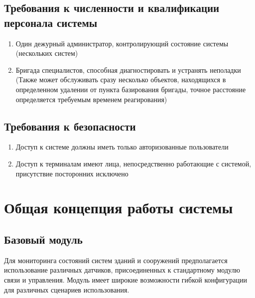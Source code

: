 \subsection{Требования к численности и квалификации персонала системы}
\begin{enumerate}
	\itemsep0em 
	\item Один дежурный администратор, контролирующий состояние системы (нескольких систем)
	\item Бригада специалистов, способная диагностировать и устранять неполадки (Также может обслуживать сразу несколько объектов, находящихся в определенном удалении от пункта базирования бригады, точное расстояние определяется требуемым временем реагирования)
	\end{enumerate}
\subsection{Требования к безопасности}
\begin{enumerate}
	\itemsep0em 
	\item Доступ к системе должны иметь только авторизованные пользователи
	\item Доступ к терминалам имеют лица, непосредственно работающие с системой, присутствие посторонних исключено
\end{enumerate}
\newpage\section{Общая концепция работы системы}
\subsection{Базовый модуль}
Для мониторинга состояний систем зданий и сооружений предполагается использование различных датчиков, присоединенных к стандартному модулю связи и управления.
Модуль имеет широкие возможности гибкой конфигурации для различных сценариев использования.

